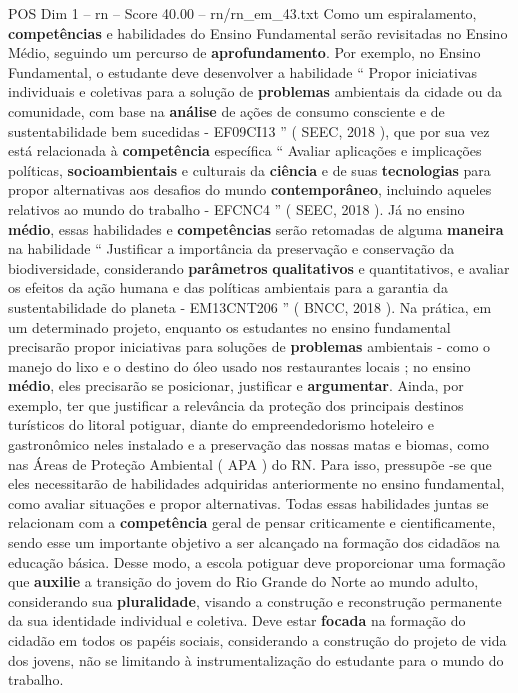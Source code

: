 \begin{textsample}{POS Dim 1 – rn – Score 40.00 – rn/rn\_em\_43.txt}
Como um espiralamento, \textbf{competências} e habilidades do Ensino Fundamental serão revisitadas no Ensino Médio, seguindo um percurso de \textbf{aprofundamento}.
Por exemplo, no Ensino Fundamental, o estudante deve desenvolver a habilidade “ Propor iniciativas individuais e coletivas para a solução de \textbf{problemas} ambientais da cidade ou da comunidade, com base na \textbf{análise} de ações de consumo consciente e de sustentabilidade bem sucedidas - EF09CI13 ” ( SEEC, 2018 ), que por sua vez está relacionada à \textbf{competência} específica “ Avaliar aplicações e implicações políticas, \textbf{socioambientais} e culturais da \textbf{ciência} e de suas \textbf{tecnologias} para propor alternativas aos desafios do mundo \textbf{contemporâneo}, incluindo aqueles relativos ao mundo do trabalho - EFCNC4 ” ( SEEC, 2018 ).
Já no ensino \textbf{médio}, essas habilidades e \textbf{competências} serão retomadas de alguma \textbf{maneira} na habilidade “ Justificar a importância da preservação e conservação da biodiversidade, considerando \textbf{parâmetros} \textbf{qualitativos} e quantitativos, e avaliar os efeitos da ação humana e das políticas ambientais para a garantia da sustentabilidade do planeta - EM13CNT206 ” ( BNCC, 2018 ).
Na prática, em um determinado projeto, enquanto os estudantes no ensino fundamental precisarão propor iniciativas para soluções de \textbf{problemas} ambientais - como o manejo do lixo e o destino do óleo usado nos restaurantes locais ; no ensino \textbf{médio}, eles precisarão se posicionar, justificar e \textbf{argumentar}.
Ainda, por exemplo, ter que justificar a relevância da proteção dos principais destinos turísticos do litoral potiguar, diante do empreendedorismo hoteleiro e gastronômico neles instalado e a preservação das nossas matas e biomas, como nas Áreas de Proteção Ambiental ( APA ) do RN.
Para isso, pressupõe -se que eles necessitarão de habilidades adquiridas anteriormente no ensino fundamental, como avaliar situações e propor alternativas.
Todas essas habilidades juntas se relacionam com a \textbf{competência} geral de pensar criticamente e cientificamente, sendo esse um importante objetivo a ser alcançado na formação dos cidadãos na educação básica.
Desse modo, a escola potiguar deve proporcionar uma formação que \textbf{auxilie} a transição do jovem do Rio Grande do Norte ao mundo adulto, considerando sua \textbf{pluralidade}, visando a construção e reconstrução permanente da sua identidade individual e coletiva.
Deve estar \textbf{focada} na formação do cidadão em todos os papéis sociais, considerando a construção do projeto de vida dos jovens, não se limitando à instrumentalização do estudante para o mundo do trabalho.

\end{textsample}
